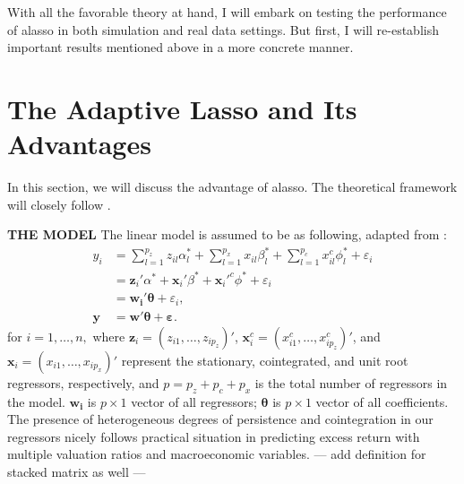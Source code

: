 \documentclass[12pt,a4paper]{article}
\begin{document}
With all the favorable theory at hand, I will embark on testing the performance of alasso in both simulation and real data settings. But first, I will re-establish important results mentioned above in a more concrete manner.

\section{The Adaptive Lasso and Its Advantages}
In this section, we will discuss the advantage of alasso. The theoretical framework will closely follow \cite{tibshirani1996regression, knight2008shrinkage, zou2006adaptive, lee2018lasso}.

\textbf{THE MODEL}
The linear model is assumed to be as following, adapted from \cite{lee2018lasso}: \begin{equation}\label{eq:1}
\begin{aligned}
	y_i & = \sum_{l=1}^{p_z}z_{il}\alpha_{l}^{*} + 
	\sum_{l=1}^{p_x}x_{il}\beta_{l}^{*} + 
	\sum_{l=1}^{p_c}x_{il}^c\phi_{l}^{*} +
	\varepsilon_i \\
		& = \bm{z}_i'\alpha^* + 
		\bm{x}_i'\beta^* + 
		\bm{x}_i'^c\phi^* + \varepsilon_i \\
		& = \bm{w_i}'\bm{\theta} + \varepsilon_i, \\
	\bm{y} & = \bm{w}'\bm{\theta} + \bm{\varepsilon}.
\end{aligned}
\end{equation}
for $ i = 1,\ldots, n, $ where $ \bm{z}_i = (z_{i1}, \ldots, z_{ip_z})' $, $ \bm{x}^c_i = (x^c_{i1}, \ldots, x^c_{ip_z})' $, and $ \bm{x}_i = (x_{i1}, \ldots, x_{ip_x})' $ represent the stationary, cointegrated, and unit root regressors, respectively, and $p = p_z + p_c + p_x$ is the total number of regressors in the model. $\bm{w_i}$ is $ p \times 1 $ vector of all regressors; $\bm{\theta}$ is $p \times 1$  vector of all coefficients. The presence of heterogeneous degrees of persistence and cointegration in our regressors nicely follows practical situation in predicting excess return with multiple valuation ratios and macroeconomic variables. --- add definition for stacked matrix as well ---
\end{document}
